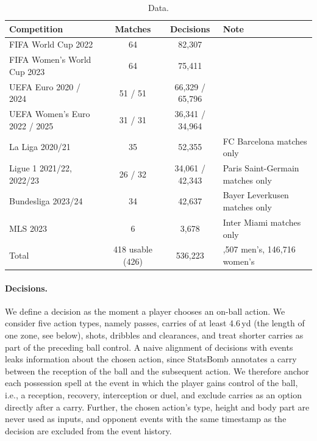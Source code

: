 \begin{table}[htbp]
\caption{Data.}
\label{tab:data}
\small
\begin{tabularx}{\linewidth}{lcc>{\raggedright\arraybackslash}X}
\toprule
Competition & Matches & Decisions & Note \\
\midrule
FIFA World Cup 2022 & 64 & 82,307 & \\
FIFA Women's World Cup 2023 & 64 & 75,411 & \\
UEFA Euro 2020 / 2024 & 51 / 51 & 66,329 / 65,796 & \\
UEFA Women's Euro 2022 / 2025 & 31 / 31 & 36,341 / 34,964 & \\
La Liga 2020/21 & 35 & 52,355 & FC Barcelona matches only \\
Ligue 1 2021/22, 2022/23 & 26 / 32 & 34,061 / 42,343 & Paris Saint-Germain matches only \\
Bundesliga 2023/24 & 34 & 42,637 & Bayer Leverkusen matches only \\
MLS 2023 & 6 & 3,678 & Inter Miami matches only \\
\midrule
Total & 418 usable (426) & 536,223 & 389,507 men's, 146,716 women's \\
\bottomrule
\end{tabularx}
\end{table}

\paragraph{Decisions.} We define a decision as the moment a player chooses an on-ball action. We consider five action
types, namely passes, carries of at least 4.6\,yd (the length of one zone, see below), shots, dribbles and
clearances, and treat shorter carries as part of the preceding ball control. A naive alignment of decisions with
events leaks information about the chosen action, since StatsBomb annotates a carry between the reception of the
ball and the subsequent action. We therefore anchor each possession spell at the event in which the player gains
control of the ball, i.e., a reception, recovery, interception or duel, and exclude carries as an option directly
after a carry. Further, the chosen action's type, height and body part are never used as inputs, and opponent events
with the same timestamp as the decision are excluded from the event history.

